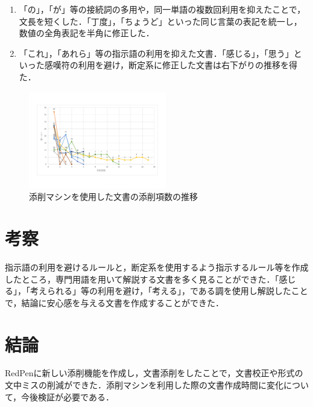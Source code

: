 \documentclass[uplatex,twocolumn,dvipdfmx]{jsarticle}
\begin{document}
\begin{enumerate}
\item 「の」，「が」等の接続詞の多用や，同一単語の複数回利用を抑えたことで，文長を短くした．「丁度」，「ちょうど」といった同じ言葉の表記を統一し，数値の全角表記を半角に修正した． 
\item 「これ」，「あれら」等の指示語の利用を抑えた文書．「感じる」，「思う」といった感嘆符の利用を避け，断定系に修正した文書は右下がりの推移を得た．
\end{enumerate}

\begin{figure}[htb]
\centering
\includegraphics[width=6cm,clip]{redpen.pdf}
\caption{添削マシンを使用した文書の添削項数の推移}\label{conf}
\end{figure}

\section{考察}
指示語の利用を避けるルールと，断定系を使用するよう指示するルール等を作成したところ，専門用語を用いて解説する文書を多く見ることができた．「感じる」，「考えられる」等の利用を避け，「考える」，である調を使用し解説したことで，結論に安心感を与える文書を作成することができた．

\section{結論}
RedPenに新しい添削機能を作成し，文書添削をしたことで，文書校正や形式の文中ミスの削減ができた．添削マシンを利用した際の文書作成時間に変化について，今後検証が必要である．






\end{document}

